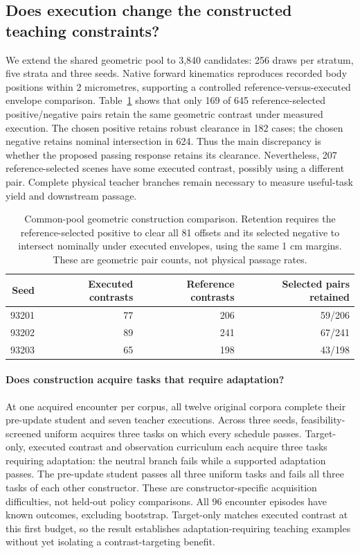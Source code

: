 \documentclass[10pt]{article}
\begin{document}
\subsection{Does execution change the constructed teaching constraints?}
We extend the shared geometric pool to 3,840 candidates: 256 draws per stratum,
five strata and three seeds. Native forward kinematics reproduces recorded body
positions within 2 micrometres, supporting a controlled reference-versus-executed
envelope comparison. Table~\ref{tab:construction_geometry} shows that only
169 of 645 reference-selected positive/negative pairs retain the same geometric
contrast under measured execution. The chosen positive retains robust clearance
in 182 cases; the chosen negative retains nominal intersection in 624. Thus the
main discrepancy is whether the proposed passing response retains its clearance.
Nevertheless, 207 reference-selected scenes have some executed contrast, possibly
using a different pair. Complete physical teacher branches remain necessary to
measure useful-task yield and downstream passage.

\begin{table}[t]
\centering\small
\begin{tabular}{rrrr}
\toprule
Seed & Executed contrasts & Reference contrasts & Selected pairs retained \\
\midrule
93201 & 77 & 206 & 59/206 \\
93202 & 89 & 241 & 67/241 \\
93203 & 65 & 198 & 43/198 \\
\bottomrule
\end{tabular}
\caption{Common-pool geometric construction comparison. Retention requires the
reference-selected positive to clear all 81 offsets and its selected negative
to intersect nominally under executed envelopes, using the same 1 cm margins.
These are geometric pair counts, not physical passage rates.}
\label{tab:construction_geometry}
\end{table}

\paragraph{Does construction acquire tasks that require adaptation?}
At one acquired encounter per corpus, all twelve original corpora complete their
pre-update student and seven teacher executions. Across three seeds,
feasibility-screened uniform acquires three tasks on which every schedule passes.
Target-only, executed contrast and observation curriculum each acquire three
tasks requiring adaptation: the neutral branch fails while a supported
adaptation passes. The pre-update student passes all three uniform tasks and
fails all three tasks of each other constructor. These are constructor-specific
acquisition difficulties, not held-out policy comparisons. All 96 encounter
episodes have known outcomes, excluding bootstrap. Target-only matches executed
contrast at this first budget, so the result establishes adaptation-requiring
teaching examples without yet isolating a contrast-targeting benefit.
\end{document}
